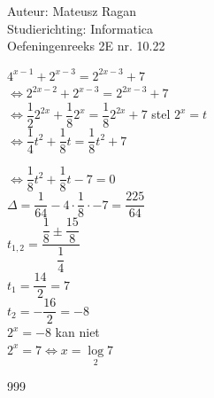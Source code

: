 \documentclass[a4paper]{article}
\begin{document}
\noindent \large Auteur: Mateusz Ragan \\
\noindent \large Studierichting: Informatica\\
\noindent \large Oefeningenreeks 2E nr. 10.22\\

\medskip

\normalsize

$4^{x-1} + 2^{x-3} = 2^{2x-3}+7$\\

$\Leftrightarrow 2^{2x-2} + 2^{x-3} = 2^{2x-3}+7$\\

$\Leftrightarrow \dfrac{1}{2} 2^{2x} + \dfrac{1}{8}2^{x} = \dfrac{1}{8}2^{2x}+7$ stel $2^x = t$\\

$\Leftrightarrow \dfrac{1}{4}t^2 + \dfrac{1}{8}t = \dfrac{1}{8}t^2 + 7$

$\Leftrightarrow \dfrac{1}{8}t^2 + \dfrac{1}{8}t -7 = 0$\\

$\Delta = \dfrac{1}{64} - 4\cdot \dfrac{1}{8}\cdot -7 = \dfrac{225}{64}$\\

$t_{1,2} = \dfrac{\dfrac{1}{8}\pm \dfrac{15}{8}}{\dfrac{1}{4}}$\\

$ t_{1} = \dfrac{14}{2} = 7$\\

$ t_{2} = -\dfrac{16}{2} = -8$\\


$2^x = -8$ kan niet \\


$2^x = 7 \Leftrightarrow x = \log\limits_{2}7$





\begin{thebibliography}{999}
\end{thebibliography}
\end{document}
